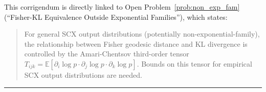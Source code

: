 \documentclass{article}
\newcommand{\E}{\mathbb{E}}
\begin{document}
This corrigendum is directly linked to Open Problem~\ref{prob:non_exp_fam}
(``Fisher-KL Equivalence Outside Exponential Families''), which states:

\begin{quote}
For general SCX output distributions (potentially non-exponential-family),
the relationship between Fisher geodesic distance and KL divergence is controlled
by the Amari-Chentsov third-order tensor $T_{ijk} = \E[\partial_i \log p \cdot \partial_j \log p \cdot \partial_k \log p]$.
Bounds on this tensor for empirical SCX output distributions are needed.
\end{quote}

\vspace{1em}
\noindent\rule{\textwidth}{0.5pt}
\vspace{0.5em}

\end{document}
